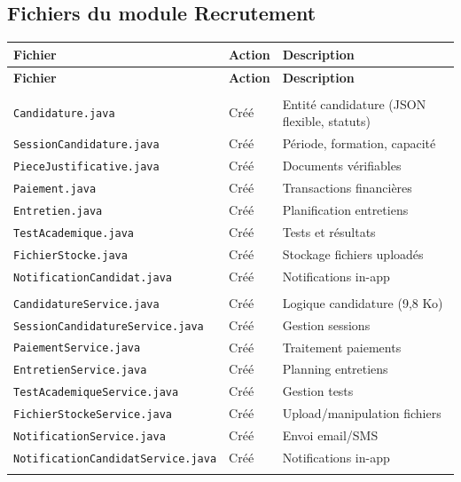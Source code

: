 \documentclass[a4paper,12pt,french]{article}
\begin{document}
\subsection{Fichiers du module Recrutement}

\begin{center}
\begin{longtable}{|l|l|p{4cm}|}
\hline
\textbf{Fichier} & \textbf{Action} & \textbf{Description} \\
\hline
\endfirsthead
\hline
\textbf{Fichier} & \textbf{Action} & \textbf{Description} \\
\hline
\endhead
\addlinespace
\multicolumn{3}{|c|}{\textbf{Backend — Entités}} \\
\hline
\texttt{Candidature.java} & Créé & Entité candidature (JSON flexible, statuts) \\
\texttt{SessionCandidature.java} & Créé & Période, formation, capacité \\
\texttt{PieceJustificative.java} & Créé & Documents vérifiables \\
\texttt{Paiement.java} & Créé & Transactions financières \\
\texttt{Entretien.java} & Créé & Planification entretiens \\
\texttt{TestAcademique.java} & Créé & Tests et résultats \\
\texttt{FichierStocke.java} & Créé & Stockage fichiers uploadés \\
\texttt{NotificationCandidat.java} & Créé & Notifications in-app \\
\hline
\addlinespace
\multicolumn{3}{|c|}{\textbf{Backend — Services}} \\
\hline
\texttt{CandidatureService.java} & Créé & Logique candidature (9,8 Ko) \\
\texttt{SessionCandidatureService.java} & Créé & Gestion sessions \\
\texttt{PaiementService.java} & Créé & Traitement paiements \\
\texttt{EntretienService.java} & Créé & Planning entretiens \\
\texttt{TestAcademiqueService.java} & Créé & Gestion tests \\
\texttt{FichierStockeService.java} & Créé & Upload/manipulation fichiers \\
\texttt{NotificationService.java} & Créé & Envoi email/SMS \\
\texttt{NotificationCandidatService.java} & Créé & Notifications in-app \\
\hline
\addlinespace

\end{longtable}
\end{center}
\end{document}
